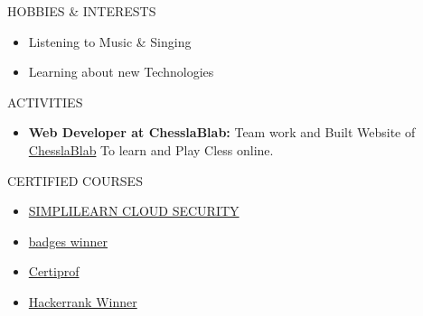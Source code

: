 \documentclass{resume}
\begin{document}
\begin{rSection}{HOBBIES \& INTERESTS}
    \begin{itemize}
        \item Listening to Music \& Singing
              \vspace{-0.4em}
        \item Learning about new Technologies
    \end{itemize}
\end{rSection}
\vspace{-0.4em}

\begin{rSection}{ACTIVITIES}
    \begin{itemize}
        \item \textbf{Web Developer at ChesslaBlab:} Team work and Built Website of {\href{https://github.com/chesslablab}{ChesslaBlab}}  To learn and Play Cless online.
    \end{itemize}
\end{rSection}

\begin{rSection}{CERTIFIED COURSES}
    \begin{itemize}
        \item \href{https://simpli-web.app.link/e/xZ3GpSgkkMb}{SIMPLILEARN CLOUD SECURITY}
        \item \href{https://www.credly.com/badges/6025a592-85b2-4f2b-ae92-93cf83aa0ef6}{badges winner}
        \item \href{https://app.kajabi.com/certificates/1d00b4fe}{Certiprof}
        \item \href{https://www.hackerrank.com/certificates/79c09382a64c}{Hackerrank Winner}
    \end{itemize}
    \vspace{-0.4em}
\end{rSection}
\end{document}
